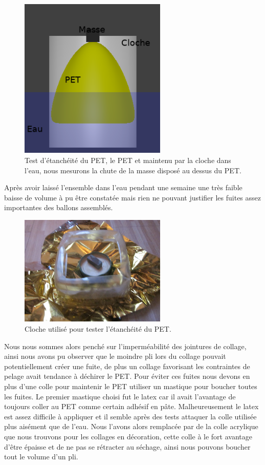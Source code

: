 \documentclass[a4paper,11pt]{article}
\begin{document}
\begin{figure}[H]
	\centering
	\includegraphics[width=7cm]{../Images/etancheite.png}
	\caption{Test d'étanchéité du PET, le PET et maintenu par la cloche dans l'eau, nous mesurons la chute de la masse disposé au dessus du PET.}
\end{figure}

Après avoir laissé l'ensemble dans l'eau pendant une semaine une très faible baisse de volume à pu être constatée mais rien ne pouvant justifier les fuites assez importantes des ballons assemblés.

\begin{figure}[H]
 \centering
 \includegraphics[width=7cm]{../Images/cloche_pet.JPG}
 \caption{Cloche utilisé pour tester l'étanchéité du PET.}
\end{figure}



Nous nous sommes alors penché sur l’imperméabilité des jointures de collage, ainsi nous avons pu observer que le moindre pli lors du collage pouvait potentiellement créer une fuite, de plus un collage favorisant les contraintes de pelage avait tendance à déchirer le PET. Pour éviter ces fuites nous devons en plus d'une colle pour maintenir le PET utiliser un mastique pour boucher toutes les fuites. Le premier mastique choisi fut le latex car il avait l'avantage de toujours coller au PET comme certain adhésif en pâte. Malheureusement le latex est assez difficile à appliquer et il semble après des tests attaquer la colle utilisée plus aisément que de l'eau. Nous l'avons alors remplacée par de la colle acrylique que nous trouvons pour les collages en décoration, cette colle à le fort avantage d'être épaisse et de ne pas se rétracter au séchage, ainsi nous pouvons boucher tout le volume d'un pli.
\end{document}
